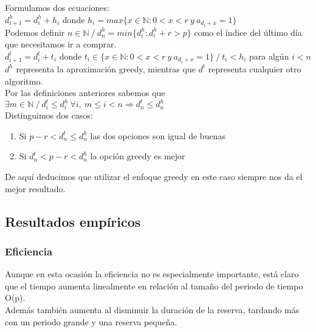 Formulamos dos ecuaciones:\\

$d_{i+1}^h = d_i^h + h_i$ donde $h_i = max\{x \in \mathbb{N} : 0<x<r\ y\ a_{d_i+x} = 1\}$\\
Podemos definir $n \in \mathbb{N}\ /\ d_n^h = min\{d_i^h: d_i^h + r > p\}$ como el índice del último día que necesitamos ir a comprar.\\

$d_{i+1}^t = d_i^t + t_i$ donde $t_i \in \{x \in \mathbb{N} : 0<x<r\ y\ a_{d_i+x} = 1\}\ /\ t_i < h_i$ para algún $i<n$\\

$d^{h}$ representa la aproximación greedy, mientras que $d^{t}$ representa cualquier otro algoritmo.\\

Por las definiciones anteriores sabemos que $\exists m \in \mathbb{N}\ /\ d_i^{t} \leq d_i^{h}\ \forall i,\ m \leq i<n \Rightarrow d_n^{t} \leq d_n^{h}$\\
Distinguimos dos casos:\\
\begin{enumerate}
\item Si $p-r < d_n^{t} \leq d_n^{h}$ las dos opciones son igual de buenas\\
\item Si $d_n^{t} < p-r < d_n^{h}$ la opción greedy es mejor\\
\end{enumerate}

De aquí deducimos que utilizar el enfoque greedy en este caso siempre nos da el mejor resultado.\\



\subsection{Resultados empíricos}
\subsubsection{Eficiencia}

Aunque en esta ocasión la eficiencia no es especialmente importante, está claro que el tiempo aumenta linealmente en relación al tamaño del periodo de tiempo O(p).\\

Además también aumenta al disminuir la duración de la reserva, tardando más con un periodo grande y una reserva pequeña.\\

